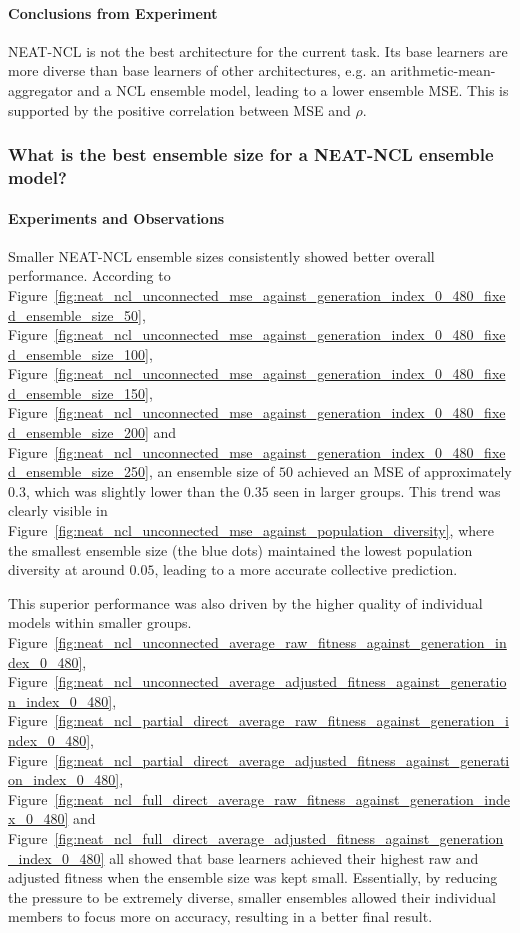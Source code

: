 \documentclass{article}
\begin{document}
\paragraph{Conclusions from Experiment}
NEAT-NCL is not the best architecture for the current task. Its base learners are more diverse than base learners of other architectures, e.g. an arithmetic-mean-aggregator and a NCL ensemble model, leading to a lower ensemble MSE. This is supported by the positive correlation between MSE and $\rho$. 


\subsubsection{What is the best ensemble size for a NEAT-NCL ensemble model? }
\paragraph{Experiments and Observations}
Smaller NEAT-NCL ensemble sizes consistently showed better overall performance. According to Figure~\ref{fig:neat_ncl_unconnected_mse_against_generation_index_0_480_fixed_ensemble_size_50}, Figure~\ref{fig:neat_ncl_unconnected_mse_against_generation_index_0_480_fixed_ensemble_size_100}, Figure~\ref{fig:neat_ncl_unconnected_mse_against_generation_index_0_480_fixed_ensemble_size_150}, Figure~\ref{fig:neat_ncl_unconnected_mse_against_generation_index_0_480_fixed_ensemble_size_200} and Figure~\ref{fig:neat_ncl_unconnected_mse_against_generation_index_0_480_fixed_ensemble_size_250}, an ensemble size of $50$ achieved an MSE of approximately $0.3$, which was slightly lower than the $0.35$ seen in larger groups. This trend was clearly visible in Figure~\ref{fig:neat_ncl_unconnected_mse_against_population_diversity}, where the smallest ensemble size (the blue dots) maintained the lowest population diversity at around $0.05$, leading to a more accurate collective prediction. 

This superior performance was also driven by the higher quality of individual models within smaller groups. Figure~\ref{fig:neat_ncl_unconnected_average_raw_fitness_against_generation_index_0_480}, Figure~\ref{fig:neat_ncl_unconnected_average_adjusted_fitness_against_generation_index_0_480}, Figure~\ref{fig:neat_ncl_partial_direct_average_raw_fitness_against_generation_index_0_480}, Figure~\ref{fig:neat_ncl_partial_direct_average_adjusted_fitness_against_generation_index_0_480}, Figure~\ref{fig:neat_ncl_full_direct_average_raw_fitness_against_generation_index_0_480} and Figure~\ref{fig:neat_ncl_full_direct_average_adjusted_fitness_against_generation_index_0_480} all showed that base learners achieved their highest raw and adjusted fitness when the ensemble size was kept small. Essentially, by reducing the pressure to be extremely diverse, smaller ensembles allowed their individual members to focus more on accuracy, resulting in a better final result. 
\end{document}
